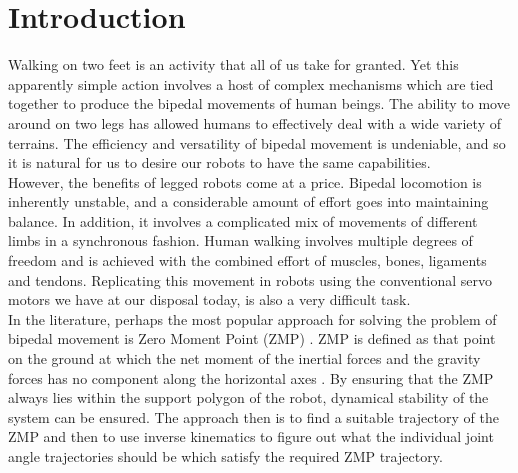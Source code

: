 \documentclass[12pt,twoside]{article}
\theoremstyle{plain}
\theoremstyle{definition}
\theoremstyle{remark}
\newcommand{\forceindent}{\leavevmode{\parindent=2em\indent}}
\begin{document}
\setcounter{tocdepth}{2} 					%
\tableofcontents
{}
\clearpage



\graphicspath{{images/}}

\section{Introduction}
\label{sec:introduction}
Walking on two feet is an activity that all of us take for granted. Yet this apparently simple action involves a host of complex mechanisms which are tied together to produce the bipedal movements of human beings. The ability to move around on two legs has allowed humans to effectively deal with a wide variety of terrains. The efficiency and versatility of bipedal movement is undeniable, and so it is natural for us to desire our robots to have the same capabilities.\\
\forceindent However, the benefits of legged robots come at a price. Bipedal locomotion is inherently unstable, and a considerable amount of effort goes into maintaining balance. In addition, it involves a complicated mix of  movements of different limbs in a synchronous fashion. Human walking involves multiple degrees of freedom and is achieved with the combined effort of muscles, bones, ligaments and tendons. Replicating this movement in robots using the conventional servo motors we have at our disposal today, is also a very difficult task.\\
\forceindent In the literature, perhaps the most popular approach for solving the problem of bipedal movement is Zero Moment Point (ZMP) \cite{vukobratovic1969contribution, jurivcic1972mathematical}. ZMP is defined as that point on the ground at which the net moment of the inertial forces and the gravity forces has no component along the horizontal axes \cite{vukobratovic2004zero}. By ensuring that the ZMP always lies within the support polygon of the robot, dynamical stability of the system can be ensured. The approach then is to find a suitable trajectory of the ZMP and then to use inverse kinematics to figure out what the individual joint angle trajectories should be which satisfy the required ZMP trajectory.\\
\end{document}
